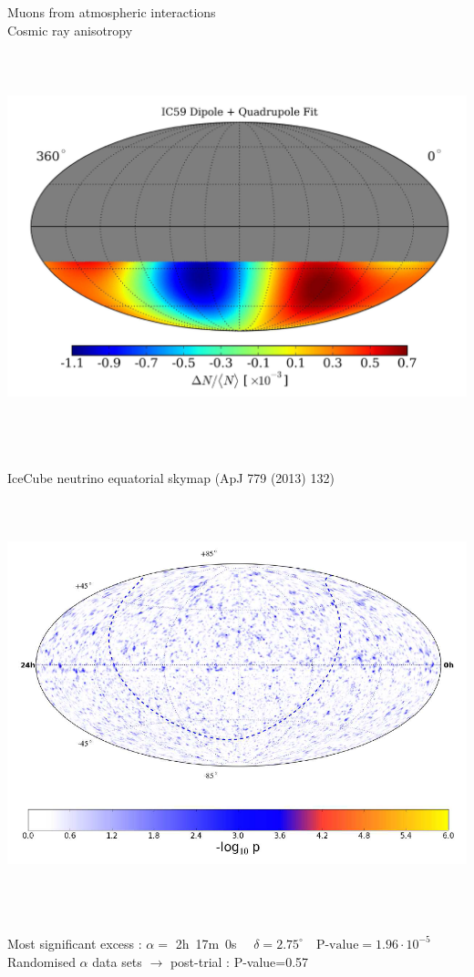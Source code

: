\Tr
\begin{center}
{\red Muons from atmospheric interactions}\\[1cm]
{\blue Cosmic ray anisotropy}\\[5mm]
\includegraphics[keepaspectratio,height=12cm]{cr-anisotropy}
\end{center}

\Tr
\onecolumn
\begin{center}
{\blue IceCube neutrino equatorial skymap (ApJ 779 (2013) 132)}\\
\includegraphics[keepaspectratio,height=12.5cm]{ic79+59+40-skymap}
\end{center}
Most significant excess : $\alpha =$ 2h~17m~0s $\quad \delta = 2.75^{\circ} \quad \text{P-value} = 1.96 \cdot 10^{-5}$\\
Randomised $\alpha$ data sets $\rightarrow$ post-trial : P-value=0.57
